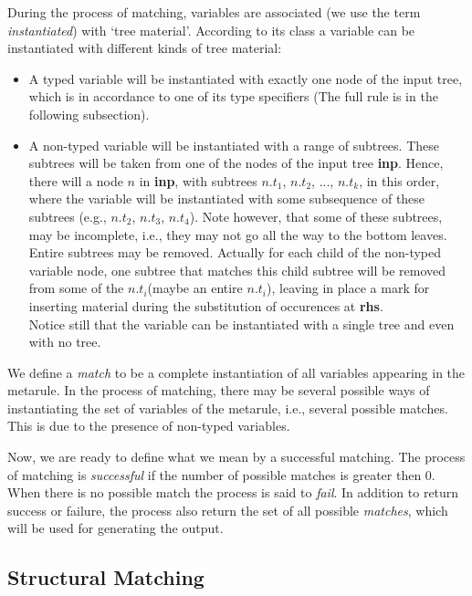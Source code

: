 During the process of matching, variables are associated (we use the
term {\it instantiated}) with `tree material'.  According to its class
a variable can be instantiated with different kinds of tree material:

\begin{itemize}
\item   A typed variable will be instantiated with exactly one node of
        the input tree, which is in accordance to one of its type specifiers
        (The full rule is in the following subsection). 

\item   A non-typed variable will be instantiated with a range of subtrees.
        These subtrees will be taken from one of the nodes of the input tree
        {\bf inp}. Hence, there will a node $n$ in {\bf inp}, with subtrees
        $n.t_1$, $n.t_2$, ..., $n.t_k$, in this order, where the variable
        will be instantiated with some subsequence of these subtrees 
        (e.g., $n.t_2$, $n.t_3$, $n.t_4$). Note however, that some of these
        subtrees, may be incomplete, i.e., they may not go all the way to the 
        bottom leaves. Entire subtrees may be removed. Actually for each
        child of the non-typed variable node, one subtree that matches this
        child subtree will be removed from some of the $n.t_i$(maybe an entire
        $n.t_i$), leaving in place a mark for inserting material during the
        substitution of occurences at {\bf rhs}.\\
        Notice still that the variable can
        be instantiated with a single tree and even with no tree. 

\end{itemize} 

We define a {\it match} to be a complete instantiation of all variables 
appearing in the metarule. In the process of matching, there may be several
possible ways of instantiating the set of variables of the metarule, i.e.,
several possible matches. This is due to the presence of non-typed variables.

Now, we are ready to define what we mean by a successful matching. The process
of matching is {\it successful} 
if the number of possible matches is greater then 0.
When there is no possible match the process is said to {\it fail}.
In addition to return success or failure, the process also return the set of
all possible {\it matches}, which will be used for generating the output.

\subsection{Structural Matching}

